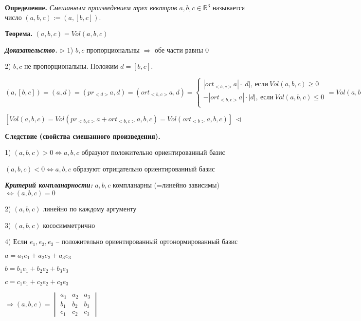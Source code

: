 \vspace{\baselineskip}
\textbf{Определение.} \textit{Смешанным произведением трех векторов} $a, b, c \in \mathbb{R}^3$ называется число $(a, b, c) := (a, [b, c])$.

\vspace{\baselineskip}
\textbf{Теорема.} $(a, b, c) = Vol(a, b, c)$

\vspace{\baselineskip}
\textbf{\textit{Доказательство.}} $\rhd$ 1) $b, c$ пропорциональны $\Rightarrow$ обе части равны 0

2) $b, c$ не пропорциональны. Положим $d = [b, c]$. 

$(a, [b, c]) = (a, d) = (pr_{<d>} a, d) = (ort_{<b, c>}a, d) = \begin{cases}
		|ort_{<b, c>} a| \cdot |d|, \ если \ Vol(a, b, c) \geq 0 \\
		-|ort_{<b, c>} a| \cdot |d|, \ если \ Vol(a, b, c) \leq 0 \\
	\end{cases} = Vol(a, b, c)$

$\left[Vol(a, b, c) = Vol(pr_{<b, c>}a + ort_{<b, c>}a, b, c) = Vol(ort_{<b>}a, b, c)\right] \ \lhd$

\vspace{\baselineskip}
\textbf{Следствие (свойства смешанного произведения).}

1) $(a, b, c) > 0 \Leftrightarrow a, b, c$ образуют положительно ориентированный базис 

$(a, b, c) < 0 \Leftrightarrow a, b, c$ образуют отрицательно ориентированный базис

\vspace{\baselineskip}
\textbf{\textit{Критерий компланарности:}} $a, b, c$ компланарны (=линейно зависимы) $\Leftrightarrow (a, b, c) = 0$

2) $(a, b, c)$ линейно по каждому аргументу

3) $(a, b, c)$ кососимметрично

4) Если $e_1, e_2, e_3$ -- положительно ориентированный ортонормированный базис 

$a = a_1 e_1 + a_2 e_2 + a_3 e_3$

$b = b_1 e_1 + b_2 e_2 + b_3 e_3$

$c = c_1 e_1 + c_2 e_2 + c_3 e_3$

$\Rightarrow (a, b, c) = \begin{vmatrix} a_1 & a_2 & a_3 \\ b_1 & b_2 & b_3 \\ c_1 & c_2 & c_3 \end{vmatrix}$

